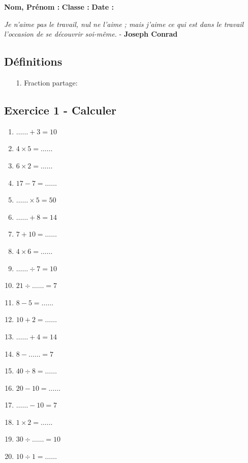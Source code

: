 \Pointilles[47]

\newpage


\textbf{Nom, Prénom :} \hspace{8cm} \textbf{Classe :} \hspace{3cm} \textbf{Date :}\\
\vspace{-0.8cm}
\begin{center}
  \textit{Je n'aime pas le travail, nul ne l'aime ; mais j'aime ce qui est dans le travail l'occasion de se découvrir soi-même.}  - \textbf{Joseph Conrad}
\end{center}
\vspace{-0.8cm}

\subsection*{Définitions}
  \begin{enumerate}
    \item[1.] Fraction partage: \dotfill \\
    \Pointilles[2]
  \end{enumerate}

\subsection*{Exercice 1 - Calculer}

\begin{multicols}{3}\noindent
    \begin{enumerate}
      \item $\ldots\ldots + 3 = 10$
      \item $4 \times 5 = \ldots\ldots$
      \item $6 \times 2 = \ldots\ldots$
      \item $17 - 7 = \ldots\ldots$
      \item $\ldots\ldots \times 5 = 50$
      \item $\ldots\ldots + 8 = 14$
      \item $7 + 10 = \ldots\ldots$
      \item $4 \times 6 = \ldots\ldots$
      \item $\ldots\ldots \div 7 = 10$
      \item $21 \div \ldots\ldots = 7$
      \item $8 - 5 = \ldots\ldots$
      \item $10 + 2 = \ldots\ldots$
      \item $\ldots\ldots + 4 = 14$
      \item $8 - \ldots\ldots = 7$
      \item $40 \div 8 = \ldots\ldots$
      \item $20 - 10 = \ldots\ldots$
      \item $\ldots\ldots - 10 = 7$
      \item $1 \times 2 = \ldots\ldots$
      \item $30 \div \ldots\ldots = 10$
      \item $10 \div 1 = \ldots\ldots$
    \end{enumerate}
  \end{multicols}

